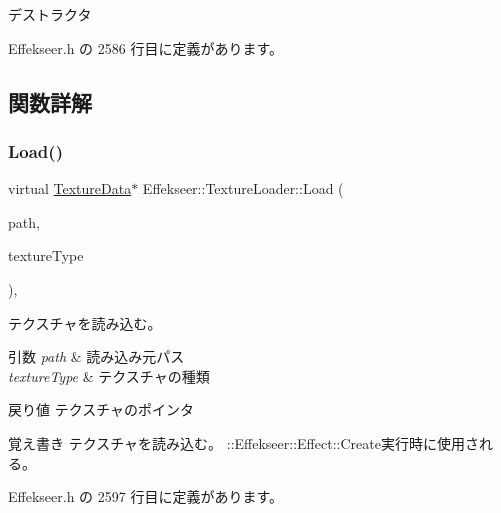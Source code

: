 デストラクタ 



 Effekseer.\+h の 2586 行目に定義があります。



\subsection{関数詳解}
\mbox{\label{class_effekseer_1_1_texture_loader_a91cc55233a4131d9994857dfe611460b}} 
\subsubsection{\texorpdfstring{Load()}{Load()}}
{\footnotesize\ttfamily virtual \mbox{\hyperlink{struct_effekseer_1_1_texture_data}{Texture\+Data}}$\ast$ Effekseer\+::\+Texture\+Loader\+::\+Load (\begin{DoxyParamCaption}\item[{const \mbox{\hyperlink{_effekseer_8h_a50b026abea014b47854bcd835b3b6233}{E\+F\+K\+\_\+\+C\+H\+AR}} $\ast$}]{path,  }\item[{\mbox{\hyperlink{namespace_effekseer_a781925ba462884c4ef87fd38ffdedba4}{Texture\+Type}}}]{texture\+Type }\end{DoxyParamCaption})\hspace{0.3cm}{\ttfamily [inline]}, {\ttfamily [virtual]}}



テクスチャを読み込む。 


\begin{DoxyParams}{引数}
{\em path} & 読み込み元パス \\
\hline
{\em texture\+Type} & テクスチャの種類 \\
\hline
\end{DoxyParams}
\begin{DoxyReturn}{戻り値}
テクスチャのポインタ 
\end{DoxyReturn}
\begin{DoxyNote}{覚え書き}
テクスチャを読み込む。 \+::\+Effekseer\+::\+Effect\+::\+Create実行時に使用される。 
\end{DoxyNote}


 Effekseer.\+h の 2597 行目に定義があります。

\mbox{\label{class_effekseer_1_1_texture_loader_a128fdd6e613758012fb9ceaf2881adb7}} 
